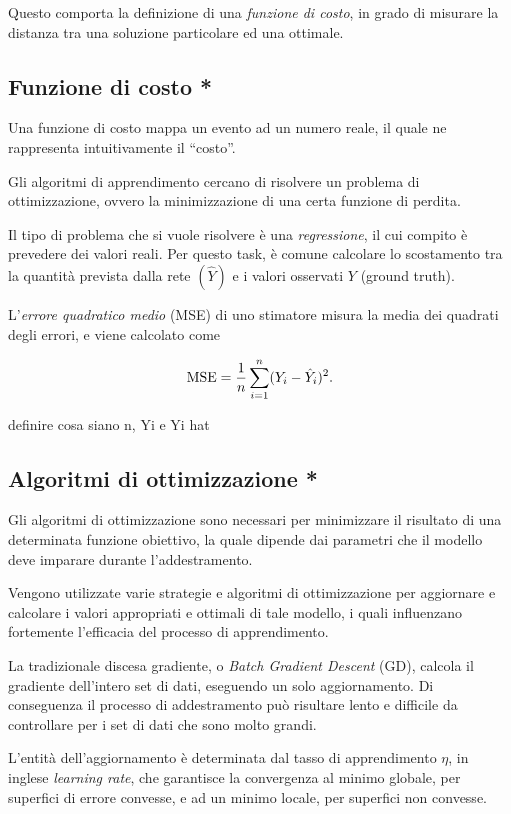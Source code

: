 Questo comporta la definizione di una \emph{funzione di costo}, in grado di misurare la distanza tra una soluzione particolare ed una ottimale. 

\subsection{Funzione di costo *}
\label{subsec:loss}

Una funzione di costo mappa un evento ad un numero reale, il quale ne rappresenta intuitivamente il ``costo''.

Gli algoritmi di apprendimento cercano di risolvere un problema di ottimizzazione, ovvero la minimizzazione di una certa funzione di perdita. 

Il tipo di problema che si vuole risolvere è una \emph{regressione}, il cui compito è prevedere dei valori reali. Per questo task, è comune calcolare lo scostamento tra la quantità prevista dalla rete $(\hat{Y})$ e i valori osservati $Y$ (ground truth). 
 
L'\emph{errore quadratico medio} (MSE) di uno stimatore misura la media dei quadrati degli errori, e viene calcolato come

\begin{equation}
\operatorname{MSE} = \frac{1}{n}\sum_{i=1}^{n}(Y_i-\hat{Y}_i)^2 \mbox{.}
\end{equation}

{\color{red} definire cosa siano n, Yi e Yi hat}
\subsection{Algoritmi di ottimizzazione *}
\label{subsec:optimizer}

Gli algoritmi di ottimizzazione sono necessari per minimizzare il risultato di una determinata funzione obiettivo, la quale dipende dai parametri che il modello deve imparare durante l'addestramento. 

Vengono utilizzate varie strategie e algoritmi di ottimizzazione per aggiornare e calcolare i valori appropriati e ottimali di tale modello, i quali influenzano fortemente l'efficacia del processo di apprendimento.

La tradizionale discesa gradiente, o \emph{Batch Gradient Descent} (GD), calcola il gradiente dell'intero set di dati, eseguendo un solo aggiornamento. Di conseguenza il processo di addestramento può risultare lento e difficile da controllare per i set di dati che sono molto grandi. 

L'entità dell'aggiornamento è determinata dal tasso di apprendimento $\eta$, in inglese \emph{learning rate}, che garantisce la convergenza al minimo globale, per superfici di errore convesse, e ad un minimo locale, per superfici non convesse. 

